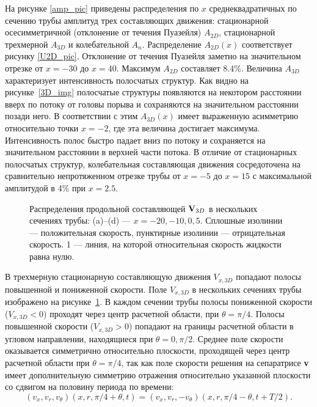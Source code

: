 На рисунке \ref{amp_pic} приведены распределения по $x$ среднеквадратичных по сечению трубы амплитуд трех составляющих движения: стационарной осесимметричной (отклонение от течения Пуазейля) $A_{2D}$, стационарной трехмерной $A_{3D}$ и колебательной $A_n$. Распределение $A_{2D}(x)$ соответствует рисунку \ref{U2D_pic}. Отклонение от течения Пуазейля заметно на значительном отрезке от $x=-30$ до $x=40$. Максимум $A_{2D}$ составляет 8.4\%. Величина $A_{3D}$ характеризует интенсивность полосчатых структур. Как видно на рисунке~\ref{3D_img} полосчатые структуры появляются на некотором расстоянии вверх по потоку от головы порыва и сохраняются на значительном расстоянии позади него. В соответствии с этим $A_{3D}(x)$ имеет выраженную асимметрию относительно точки $x=-2$, где эта величина достигает максимума. Интенсивность полос быстро падает вниз по потоку и сохраняется на значительном расстоянии в верхней части потока. В отличие от стационарных полосчатых структур, колебательная составляющая движения сосредоточена на сравнительно непротяженном отрезке трубы от $x=-5$ до $x=15$ с максимальной амплитудой в 4\% при $x=2.5$.


\begin{figure}[h]
\caption{Распределения продольной составляющей $\mathbf{V}_{3D}$ в нескольких сечениях трубы: (a)--(d) --- $x = -20, -10, 0, 5$. Сплошные изолинии --- положительная скорость, пунктирные изолинии --- отрицательная скорость. 1 --- линия, на которой относительная скорость жидкости равна нулю.}
\label{V3D_cs_pic}
\end{figure}


В трехмерную стационарную составляющую движения $V_{x,3D}$ попадают полосы повышенной и пониженной скорости. Поле $V_{x,3D}$ в нескольких сечениях трубы изображено на рисунке~\ref{V3D_cs_pic}. В каждом сечении трубы полосы пониженной скорости ($V_{x,3D} < 0$) проходят через центр расчетной области, при $\theta = \pi/4$. Полосы повышенной скорости ($V_{x,3D} > 0$) попадают на границы расчетной области в угловом направлении, находящиеся при $\theta = 0, \pi/2$. Среднее поле скорости оказывается симметрично относительно плоскости, проходящей через центр расчетной области при $\theta = \pi/4$, так как поле скорости решения на сепаратрисе $\mathbf{v}$ имеет дополнительную симметрию отражения относительно указанной плоскости со сдвигом на половину периода по времени:
\begin{equation}
(v_x, v_r, v_\theta)(x, r, \pi/4 + \theta, t) = (v_x, v_r, -v_\theta)(x, r, \pi/4 - \theta, t + T/2). 
\end{equation} 


